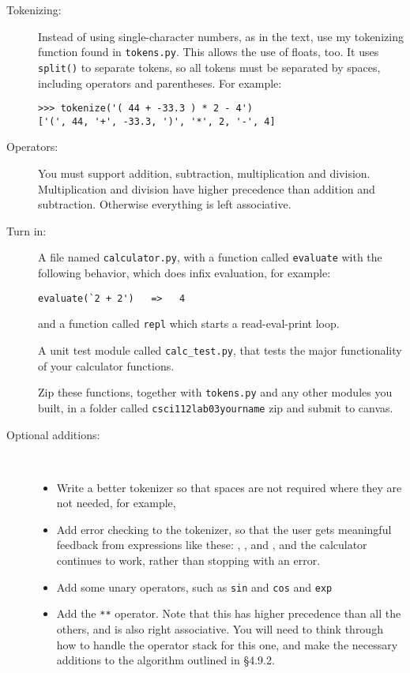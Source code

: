 \documentclass{article}
\newcommand{\bi}{\begin{itemize}}
\newcommand{\li}{\item}
\newcommand{\ei}{\end{itemize}}
\begin{document}
\begin{description}
\begin{enumerate}
\end{enumerate}


\item[Tokenizing:]  Instead of using single-character numbers, as in the text,
use my tokenizing function found in \lstinline{tokens.py}.  This allows the use
of floats, too.   It uses \lstinline{split()} to separate tokens, so all
tokens must be separated by spaces, including operators and parentheses.
For example:
\begin{lstlisting}
>>> tokenize('( 44 + -33.3 ) * 2 - 4')
['(', 44, '+', -33.3, ')', '*', 2, '-', 4]
\end{lstlisting}


\item[Operators:] You must support addition, subtraction, multiplication
and division.  Multiplication and division have higher precedence than 
addition and subtraction.  Otherwise everything is left associative.

\item[Turn in:]  A file named \lstinline{calculator.py}, with a function
called \lstinline{evaluate} with the following behavior, which does infix
evaluation, for example:
\begin{lstlisting}
evaluate(`2 + 2')   =>   4
\end{lstlisting}
and a function called \lstinline{repl} which starts a read-eval-print loop.

A unit test module called \lstinline{calc_test.py}, that tests the major
functionality of your calculator functions.

Zip these functions, together with \lstinline{tokens.py} and any other
modules you built, in a folder called \lstinline{csci112lab03yourname} zip and submit to canvas.

\item[Optional additions:]~ 

\bi
\li Write a better tokenizer so that spaces are not required where they are not
needed, for example, 
\li Add error checking to the tokenizer, so that the user gets meaningful
feedback from expressions like these:
, 
, and
,
and the calculator continues to work, rather than stopping with an error.


\li Add some unary operators, such as \lstinline{sin} and \lstinline{cos} and \lstinline{exp}


\li Add the \lstinline{**} operator.  Note that this has higher precedence
than all the others, and is also right associative.  You will need to think through
how to handle the operator stack for this one, and make the necessary
additions to the algorithm outlined in \S 4.9.2. 




\ei


\end{description}
\end{document}
